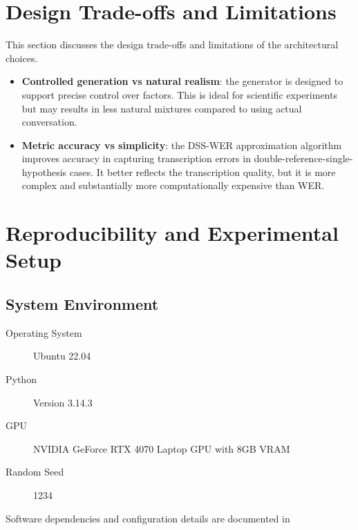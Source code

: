 \section{Design Trade-offs and Limitations}
This section discusses the design trade-offs and limitations of the architectural choices.
\begin{itemize}
    \item \textbf{Controlled generation vs natural realism}: the generator is designed to support precise control over factors. This is ideal for scientific experiments but may results in less natural mixtures compared to using actual conversation.
    \item \textbf{Metric accuracy vs simplicity}: the DSS-WER approximation algorithm improves accuracy in capturing transcription errors in double-reference-single-hypothesis cases. It better reflects the transcription quality, but it is more complex and substantially more computationally expensive than WER.
\end{itemize}
\section{Reproducibility and Experimental Setup}

\subsection*{System Environment}
\begin{description}
    \item[Operating System] Ubuntu 22.04
    \item[Python] Version 3.14.3
    \item[GPU] NVIDIA GeForce RTX 4070 Laptop GPU with 8GB VRAM
    \item[Random Seed] 1234
\end{description}
Software dependencies and configuration details are documented in 

